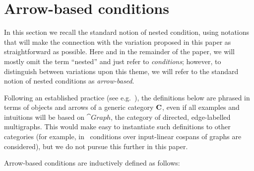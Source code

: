\section{Arrow-based conditions}

In this section we recall the standard notion of nested condition, using notations that will make the connection with the variation proposed in this paper as straightforward as possible. Here and in the remainder of the paper, we will mostly omit the term ``nested'' and just refer to \emph{conditions}; however, to distinguish between variations upon this theme, we will refer to the standard notion of nested conditions as \emph{arrow-based}.

Following an established practice (see e.g.~\cite{bchk:conditional-reactive-systems}), the definitions below are phrased in terms of objects and arrows of a generic category $\mathbf{C}$, even if all examples and intuitions will be based on $\cat{Graph}$, the category of directed, edge-labelled multigraphs. This would make easy to instantiate such definitions to other categories (for example, in~\cite{bchk:conditional-reactive-systems} conditions over input-linear cospans of graphs are considered), but we do not pursue this further in this paper.


Arrow-based conditions are inductively defined as follows:

